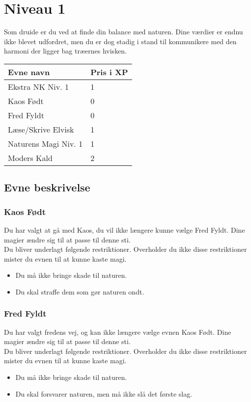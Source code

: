 \chapter{Niveau 1}
Som druide er du ved at finde din balance med naturen. Dine værdier er endnu ikke blevet udfordret, men du er dog stadig i stand til kommunikere med den harmoni der ligger bag træernes hvisken. 

\begin{table}[H]
    \centering
    \begin{tabular}{|p{}|p{}|}
    \rowcolor{cerulean!80}\hline
        Evne navn & Pris i XP \\\hline
        Ekstra NK Niv. 1& 1\\\hline
        Kaos Født & 0 \\\hline
        Fred Fyldt & 0 \\\hline
        Læse/Skrive Elvisk & 1\\\hline
        Naturens Magi Niv. 1& 1\\\hline
        Moders Kald & 2\\\hline
    \end{tabular}
\end{table}

\section{Evne beskrivelse}





\subsection{Kaos Født}
Du har valgt at gå med Kaos, du vil ikke længere kunne vælge Fred Fyldt. Dine magier ændre sig til at passe til denne sti.\\
Du bliver underlagt følgende restriktioner. Overholder du ikke disse restriktioner mister du evnen til at kunne kaste magi.
\begin{itemize}
    \item Du må ikke bringe skade til naturen.
    \item Du skal straffe dem som gør naturen ondt.
\end{itemize}

\subsection{Fred Fyldt}
Du har valgt fredens vej, og kan ikke længere vælge evnen Kaos Født. Dine magier ændre sig til at passe til denne sti.\\
Du bliver underlagt følgende restriktioner. Overholder du ikke disse restriktioner mister du evnen til at kunne kaste magi.
\begin{itemize}
    \item Du må ikke bringe skade til naturen.
    \item Du skal forsvarer naturen, men må ikke slå det første slag.
\end{itemize}

